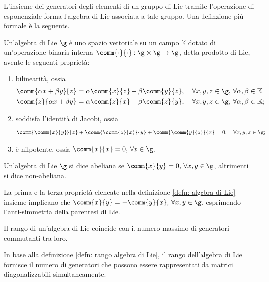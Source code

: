L'insieme dei generatori degli elementi di un gruppo di Lie tramite l'operazione di esponenziale forma l'algebra di Lie associata a tale gruppo. Una definzione più formale è la seguente.
\begin{defn}
\label{defn: algebra di Lie}
    Un'algebra di Lie $\g$ è uno spazio vettoriale su un campo $\mathbb{K}$ dotato di un'operazione binaria interna $\comm{\cdot}{\cdot} : \g\times\g \to \g$, detta prodotto di Lie, avente le seguenti proprietà:
    \begin{enumerate}
        \item bilinearità, ossia
        \begin{align}
            \comm{\alpha x +\beta y}{z} &= \alpha\comm{x}{z} + \beta\comm{y}{z},\quad\forall x,y,z\in\g,\,\forall\alpha,\beta\in\mathbb{K} \\
            \comm{z}{\alpha x + \beta y}& = \alpha\comm{z}{x} + \beta\comm{z}{y},\quad\forall x,y,z\in\g,\,\forall\alpha,\beta\in\mathbb{K};
        \end{align}
        \item soddisfa l'identità di Jacobi, ossia
        \begin{equation}
            \comm{\comm{x}{y}}{z} + \comm{\comm{z}{x}}{y} + \comm{\comm{y}{z}}{x} = 0,\quad\forall x,y,z\in\g;
        \end{equation}
        \item è nilpotente, ossia $\comm{x}{x} = 0,\,\forall x\in\g$.
    \end{enumerate}
\end{defn}
\begin{defn}
    Un'algebra di Lie $\g$ si dice abeliana se $\comm{x}{y} = 0,\,\forall x,y\in\g$, altrimenti si dice non-abeliana.
\end{defn}
La prima e la terza proprietà elencate nella definizione \ref{defn: algebra di Lie} insieme implicano che $\comm{x}{y} = -\comm{y}{x},\,\forall x,y\in\g$, esprimendo l'anti-simmetria della parentesi di Lie. 
\begin{defn}
\label{defn: rango algebra di Lie}
    Il rango di un'algebra di Lie coincide con il numero massimo di generatori commutanti tra loro.
\end{defn}
In base alla definizione \ref{defn: rango algebra di Lie}, il rango dell'algebra di Lie fornisce il numero di generatori che possono essere rappresentati da matrici diagonalizzabili simultaneamente. 

